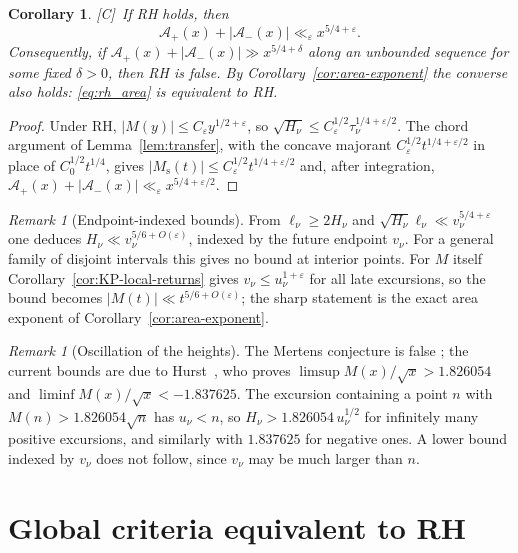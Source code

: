 \documentclass[11pt,reqno]{amsart}
\numberwithin{equation}{section}
\theoremstyle{plain}
\newtheorem{corollary}[theorem]{Corollary}
\theoremstyle{definition}
\theoremstyle{remark}
\newtheorem{remark}[theorem]{Remark}
\newcommand{\Ms}{M_{\mathrm{s}}}
\newcommand{\Ap}{\mathcal{A}_{+}}
\newcommand{\Am}{\mathcal{A}_{-}}
\newcommand{\eps}{\varepsilon}
\newcommand{\tagC}{\textup{[C]}}
\begin{document}
\begin{corollary}
\label{cor:rh}
\tagC\ If RH holds, then
\begin{equation}
\label{eq:rh_area}
  \Ap(x)+|\Am(x)|\ll_\eps x^{5/4+\eps}.
\end{equation}
Consequently, if $\Ap(x)+|\Am(x)|\gg x^{5/4+\delta}$ along an unbounded
sequence for some fixed $\delta>0$, then RH is false. By
Corollary~\ref{cor:area-exponent} the converse also holds: \eqref{eq:rh_area}
is equivalent to RH.
\end{corollary}

\begin{proof}
Under RH, $|M(y)|\le C_\eps y^{1/2+\eps}$, so
$\sqrt{H_\nu}\le C_\eps^{1/2}\tau_\nu^{1/4+\eps/2}$. The chord argument of
Lemma~\ref{lem:transfer}, with the concave majorant
$C_\eps^{1/2}t^{1/4+\eps/2}$ in place of $C_0^{1/2}t^{1/4}$, gives
$|\Ms(t)|\le C_\eps^{1/2}t^{1/4+\eps/2}$ and, after integration,
$\Ap(x)+|\Am(x)|\ll_\eps x^{5/4+\eps/2}$.
\end{proof}

\begin{remark}[Endpoint-indexed bounds]
\label{rem:onedirection}
From $\ell_\nu\ge2H_\nu$ and $\sqrt{H_\nu}\ell_\nu\ll v_\nu^{5/4+\eps}$ one
deduces $H_\nu\ll v_\nu^{5/6+O(\eps)}$, indexed by the future endpoint
$v_\nu$. For a general family of disjoint intervals this gives no bound at
interior points. For $M$ itself Corollary~\ref{cor:KP-local-returns} gives
$v_\nu\le u_\nu^{1+\eps}$ for all late excursions, so the bound becomes
$|M(t)|\ll t^{5/6+O(\eps)}$; the sharp statement is the exact area exponent
of Corollary~\ref{cor:area-exponent}.
\end{remark}

\begin{remark}[Oscillation of the heights]
\label{rem:omega}
The Mertens conjecture is false \cite{OdlyzkoTeRiele1985,KotnikTeRiele2006};
the current bounds are due to Hurst~\cite{Hurst18}, who proves
$\limsup M(x)/\sqrt{x}>1.826054$ and
$\liminf M(x)/\sqrt{x}<-1.837625$. The excursion containing a point $n$ with
$M(n)>1.826054\sqrt n$ has $u_\nu<n$, so $H_\nu>1.826054\,u_\nu^{1/2}$ for
infinitely many positive excursions, and similarly with $1.837625$ for
negative ones. A lower bound indexed by $v_\nu$ does not follow, since
$v_\nu$ may be much larger than $n$.
\end{remark}


\section{Global criteria equivalent to RH}
\label{sec:criteria}
\end{document}
